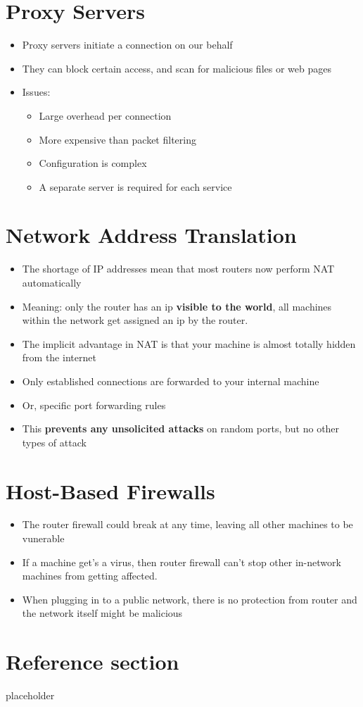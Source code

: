 \documentclass{article}
\begin{document}
\section{Proxy Servers}
\begin{itemize}
  \item Proxy servers initiate a connection on our behalf 
  \item They can block certain access, and scan for malicious files or web pages
  \item Issues:
  \begin{itemize}
    \item Large overhead per connection 
    \item More expensive than packet filtering 
    \item Configuration is complex 
    \item A separate server is required for each service
  \end{itemize}
\end{itemize}

\section{Network Address Translation}
\begin{itemize}
  \item The shortage of IP addresses mean that most routers now perform NAT automatically
  \item Meaning: only the router has an ip \textbf{visible to the world}, all machines within the network get assigned an ip by the router.
  \item The implicit advantage in NAT is that your machine is almost totally hidden from the internet 
  \item Only established connections are forwarded to your internal machine 
  \item Or, specific port forwarding rules 
  \item This\textbf{ prevents any unsolicited attacks} on random ports, but no other types of attack
\end{itemize}

\section{Host-Based Firewalls}
\begin{itemize}
  \item The router firewall could break at any time, leaving all other machines to be vunerable
  \item If a machine get's a virus, then router firewall can't stop other in-network machines from getting affected.
  \item When plugging in to a public network, there is no protection from router and the network itself might be malicious
\end{itemize}

\pagebreak
\section*{Reference section} \label{sec:reference}
\begin{description}
	\item[placeholder] \hfill \\
\end{description}
\end{document}

